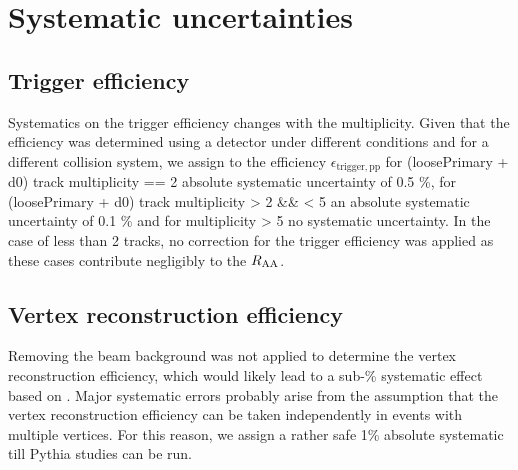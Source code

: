 \chapter{Systematic uncertainties}\label{chap:systematics}
\section{Trigger efficiency}
Systematics on the trigger efficiency changes with the multiplicity. Given that the efficiency was determined \cite{pPb_mbsptrk_trigger} using a detector under different conditions and for a different collision system, we assign to the efficiency $\epsilon_{\mathrm{trigger, pp}}$ for (loosePrimary + d0) track multiplicity == 2 absolute systematic uncertainty of 0.5 \%, for (loosePrimary + d0) track multiplicity > 2 \&\& < 5 an absolute systematic uncertainty of 0.1 \% and for multiplicity > 5 no systematic uncertainty. In the case of less than 2 tracks, no correction for the trigger efficiency was applied as these cases contribute negligibly to the $\RAA$.

\section{Vertex reconstruction efficiency}
Removing the beam background was not applied to determine the vertex reconstruction efficiency, which would likely lead to a sub-\% systematic effect based on \cite{chargedHadroninPP2010}. Major systematic errors probably arise from the assumption that the vertex reconstruction efficiency can be taken independently in events with multiple vertices. For this reason, we assign a rather safe 1\% absolute systematic till Pythia studies can be run. 

